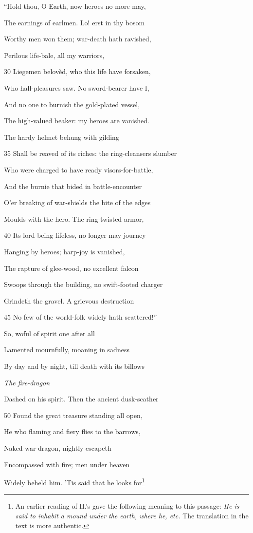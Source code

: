 “Hold thou, O Earth, now heroes no more may,

The earnings of earlmen. Lo! erst in thy bosom

Worthy men won them; war-death hath ravished,

Perilous life-bale, all my warriors,

30
Liegemen belovèd, who this life have forsaken,

Who hall-pleasures saw. No sword-bearer have I,

And no one to burnish the gold-plated vessel,

The high-valued beaker: my heroes are vanished.

The hardy helmet behung with gilding

35
Shall be reaved of its riches: the ring-cleansers slumber

Who were charged to have ready visors-for-battle,

And the burnie that bided in battle-encounter

O’er breaking of war-shields the bite of the edges

Moulds with the hero. The ring-twisted armor,

40
Its lord being lifeless, no longer may journey

Hanging by heroes; harp-joy is vanished,

The rapture of glee-wood, no excellent falcon

Swoops through the building, no swift-footed charger

Grindeth the gravel. A grievous destruction

45
No few of the world-folk widely hath scattered!”

So, woful of spirit one after all

Lamented mournfully, moaning in sadness

By day and by night, till death with its billows

\emph{The fire-dragon}

Dashed on his spirit. Then the ancient dusk-scather

50
Found the great treasure standing all open,

He who flaming and fiery flies to the barrows,

Naked war-dragon, nightly escapeth

Encompassed with fire; men under heaven

Widely beheld him. ’Tis said that he looks for\footnote{An earlier reading of H.’s gave the following meaning to this passage:
\emph{He is said to inhabit a mound under the earth, where he, etc.} The translation
in the text is more authentic.}

